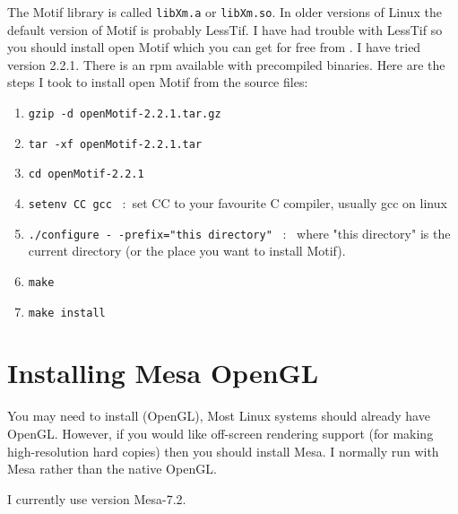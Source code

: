 \documentclass{article}
\begin{document}
The Motif library
is called {\tt libXm.a} or {\tt libXm.so}. In older versions of Linux the default version of
Motif is probably LessTif. I have had trouble with LessTif 
so you should install open Motif which you can get for free from 
. I have tried version 2.2.1.
There is an rpm available with precompiled binaries.
Here are the steps I took to install open Motif from the source files:
\begin{enumerate}
    \item {\tt gzip -d openMotif-2.2.1.tar.gz}
    \item {\tt tar -xf openMotif-2.2.1.tar}
    \item {\tt cd openMotif-2.2.1}
    \item {\tt setenv CC gcc} ~:~set CC to your favourite C compiler, usually gcc on linux
    \item {\tt ./configure -\,-prefix="this directory"} ~:~ where "this directory" is the current directory
       (or the place you want to install Motif).
    \item {\tt make}
    \item {\tt make install}
\end{enumerate}   


\clearpage
\section{Installing Mesa OpenGL}

You may need to install  (OpenGL),
Most Linux systems should already have OpenGL. However, if you would like off-screen rendering
support (for making high-resolution hard copies) then you should install Mesa. I normally run with
Mesa rather than the native OpenGL.

I currently use version Mesa-7.2.
\end{document}

